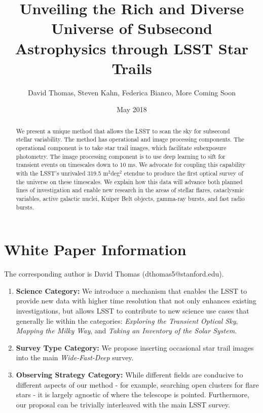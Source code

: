 \documentclass[12pt, letterpaper]{article}
\title{Unveiling the Rich and Diverse Universe of Subsecond Astrophysics through LSST Star Trails}
\author{David Thomas, Steven Kahn, Federica Bianco, {\color{green}More Coming Soon}}
\date{May 2018}
\begin{document}
\maketitle

\begin{abstract}
We present a unique method that allows the LSST to scan the sky for subsecond stellar variability. The method has operational and image processing components. The operational component is to take star trail images, which facilitate subexposure photometry. The image processing component is to use deep learning to sift for transient events on timescales down to 10 ms. We advocate for coupling this capability with the LSST's unrivaled 319.5 m$^2$deg$^2$ etendue to produce the first optical survey of the universe on these timescales. We explain how this data will advance both planned lines of investigation and enable new research in the areas of stellar flares, cataclysmic variables, active galactic nuclei, Kuiper Belt objects, gamma-ray bursts, and fast radio bursts.
\end{abstract}

\section{White Paper Information}
The corresponding author is David Thomas (dthomas5@stanford.edu).

\begin{enumerate} 
\item {\bf Science Category:} We introduce a mechanism that enables the LSST to provide new data with higher time resolution that not only enhances existing investigations, but allows LSST to contribute to new science use cases that generally lie within the categories: \textit{Exploring the Transient Optical Sky}, \textit{Mapping the Milky Way}, and \textit{Taking an Inventory of the Solar System}.

\item {\bf Survey Type Category:} We propose inserting occasional star trail images into the main \textit{Wide-Fast-Deep} survey.

\item {\bf Observing Strategy Category:}
While different fields are conducive to different aspects of our method - for example, searching open clusters for flare stars - it is largely agnostic of where the telescope is pointed. Furthermore, our proposal can be trivially interleaved with the main LSST survey.

\end{enumerate}  
\end{document}
